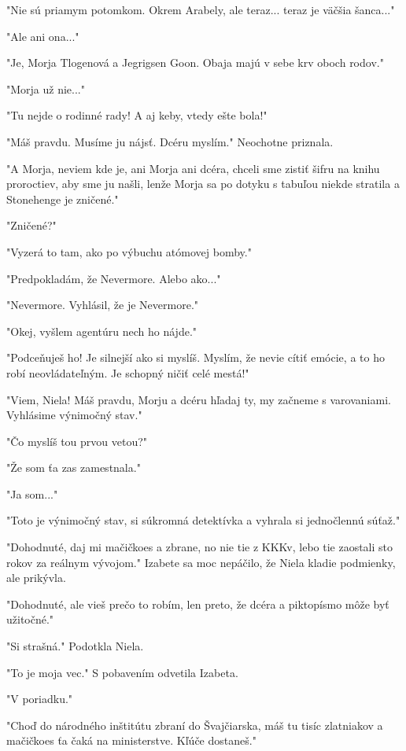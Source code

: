 \documentclass{book}
\begin{document}
"$ $Nie sú priamym potomkom. Okrem Arabely, ale teraz... teraz je väčšia šanca..."

"$ $Ale ani ona..."

"$ $Je, Morja Tlogenová a Jegrigsen Goon. Obaja majú v sebe krv oboch rodov."

"$ $Morja už nie..."

"$ $Tu nejde o rodinné rady! A aj keby, vtedy ešte bola!"

"$ $Máš pravdu. Musíme ju nájsť. Dcéru myslím."$ $ Neochotne priznala.

"$ $A Morja, neviem kde je, ani Morja ani dcéra, chceli sme zistiť šifru na knihu proroctiev, aby sme ju našli, lenže Morja sa po dotyku s tabuľou niekde stratila a Stonehenge je zničené."

"$ $Zničené?"

"$ $Vyzerá to tam, ako po výbuchu atómovej bomby."

"$ $Predpokladám, že Nevermore. Alebo ako..."

"$ $Nevermore. Vyhlásil, že je Nevermore."

"$ $Okej, vyšlem agentúru nech ho nájde."

"$ $Podceňuješ ho! Je silnejší ako si myslíš. Myslím, že nevie cítiť emócie, a to ho robí neovládateľným. Je schopný ničiť celé mestá!"

"$ $Viem, Niela! Máš pravdu, Morju a dcéru hľadaj ty, my začneme s varovaniami. Vyhlásime výnimočný stav."

"$ $Čo myslíš tou prvou vetou?"

"$ $Že som ťa zas zamestnala."

"$ $Ja som..."

"$ $Toto je výnimočný stav, si súkromná detektívka a vyhrala si jednočlennú súťaž."

"$ $Dohodnuté, daj mi mačičkoes a zbrane, no nie tie z KKKv, lebo tie zaostali sto rokov za reálnym vývojom."$ $ Izabete sa moc nepáčilo, že Niela kladie podmienky, ale prikývla.

"$ $Dohodnuté, ale vieš prečo to robím, len preto, že dcéra a piktopísmo môže byť užitočné."

"$ $Si strašná."$ $ Podotkla Niela.

"$ $To je moja vec."$ $ S pobavením odvetila Izabeta.

"$ $V poriadku."

"$ $Choď do národného inštitútu zbraní do Švajčiarska, máš tu tisíc zlatniakov a mačičkoes ťa čaká na ministerstve. Kľúče dostaneš."
\end{document}
